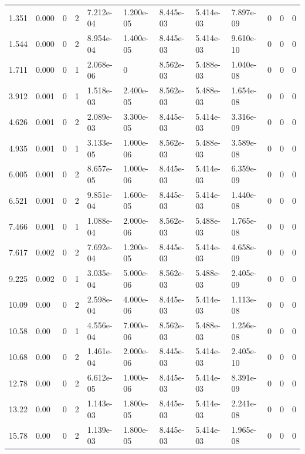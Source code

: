 \documentclass[preview]{standalone}
\begin{document}
{{\begin{tabular}{L{1.2cm}C{1.2cm} C{0.3cm}C{0.5cm} C{1.4cm}C{1.4cm} C{1.4cm}C{1.4cm} C{1.6cm}C{1.6cm} C{1.6cm}C{1.6cm}}
  1.351  &  0.000  & 0     &  2 &  7.212e-04  & 1.200e-05  &  8.445e-03&   5.414e-03& 7.897e-09 & 0   &  0 & 0  \\ 
  1.544  &  0.000  & 0     &  2 &  8.954e-04  & 1.400e-05  &  8.445e-03&   5.414e-03& 9.610e-10 & 0   &  0 & 0  \\ 
  1.711  &  0.000  & 0     &  1 &  2.068e-06  & 0  &  8.562e-03&   5.488e-03& 1.040e-08 & 0   &  0 & 0  \\ 
  3.912  &  0.001  & 0     &  1 &  1.518e-03  & 2.400e-05  &  8.562e-03&   5.488e-03& 1.654e-08 & 0   &  0 & 0  \\ 
  4.626  &  0.001  & 0     &  2 &  2.089e-03  & 3.300e-05  &  8.445e-03&   5.414e-03& 3.316e-09 & 0   &  0 & 0  \\ 
  4.935  &  0.001  & 0     &  1 &  3.133e-05  & 1.000e-06  &  8.562e-03&   5.488e-03& 3.589e-08 & 0   &  0 & 0  \\ 
  6.005  &  0.001  & 0     &  2 &  8.657e-05  & 1.000e-06  &  8.445e-03&   5.414e-03& 6.359e-09 & 0   &  0 & 0  \\ 
  6.521  &  0.001  & 0     &  2 &  9.851e-04  & 1.600e-05  &  8.445e-03&   5.414e-03& 1.440e-08 & 0   &  0 & 0  \\ 
  7.466  &  0.001  & 0     &  1 &  1.088e-04  & 2.000e-06  &  8.562e-03&   5.488e-03& 1.765e-08 & 0   &  0 & 0  \\ 
  7.617  &  0.002  & 0     &  2 &  7.692e-04  & 1.200e-05  &  8.445e-03&   5.414e-03& 4.658e-09 & 0   &  0 & 0  \\ 
  9.225  &  0.002  & 0     &  1 &  3.035e-04  & 5.000e-06  &  8.562e-03&   5.488e-03& 2.405e-09 & 0   &  0 & 0  \\ 
  10.09  &  0.00  & 0     &  2 &  2.598e-04  & 4.000e-06  &  8.445e-03&   5.414e-03& 1.113e-08 & 0   &  0 & 0  \\ 
  10.58  &  0.00  & 0     &  1 &  4.556e-04  & 7.000e-06  &  8.562e-03&   5.488e-03& 1.256e-08 & 0   &  0 & 0  \\ 
  10.68  &  0.00  & 0     &  2 &  1.461e-04  & 2.000e-06  &  8.445e-03&   5.414e-03& 2.405e-10 & 0   &  0 & 0  \\ 
  12.78  &  0.00  & 0     &  2 &  6.612e-05  & 1.000e-06  &  8.445e-03&   5.414e-03& 8.391e-09 & 0   &  0 & 0  \\ 
  13.22  &  0.00  & 0     &  2 &  1.143e-03  & 1.800e-05  &  8.445e-03&   5.414e-03& 2.241e-08 & 0   &  0 & 0  \\ 
  15.78  &  0.00  & 0     &  2 &  1.139e-03  & 1.800e-05  &  8.445e-03&   5.414e-03& 1.965e-08 & 0   &  0 & 0  \\ 

\end{tabular}}}
\end{document}
